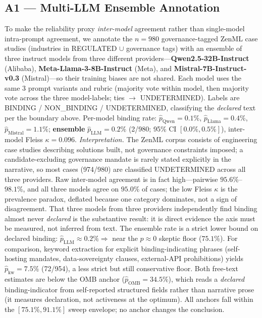 \documentclass{article} %
\begin{document}
\subsection*{A1 — Multi-LLM Ensemble Annotation}
To make the reliability proxy \emph{inter-model} agreement rather than single-model intra-prompt agreement, we annotate the $n{=}980$ governance-tagged ZenML case studies (industries in REGULATED $\cup$ governance tags) with an ensemble of three instruct models from three different providers---\textbf{Qwen2.5-32B-Instruct} (Alibaba), \textbf{Meta-Llama-3-8B-Instruct} (Meta), and \textbf{Mistral-7B-Instruct-v0.3} (Mistral)---so their training biases are not shared. Each model uses the same 3 prompt variants and rubric (majority vote within model, then majority vote across the three model-labels; ties $\to$ UNDETERMINED). Labels are BINDING / NON\_BINDING / UNDETERMINED, classifying the \emph{declared} text per the boundary above.
Per-model binding rate: $\hat{p}_{\text{Qwen}} = 0.1\%$, $\hat{p}_{\text{Llama}} = 0.4\%$, $\hat{p}_{\text{Mistral}} = 1.1\%$; \textbf{ensemble} $\hat{p}_{\text{LLM}} = 0.2\%$ (2/980; 95\% CI $[0.0\%, 0.5\%]$), inter-model Fleiss $\kappa = 0.096$.
\emph{Interpretation.} The ZenML corpus consists of engineering case studies describing solutions built, not governance constraints imposed; a candidate-excluding governance mandate is rarely stated explicitly in the narrative, so most cases (974/980) are classified UNDETERMINED across all three providers. Raw inter-model agreement is in fact high---pairwise $95.6\%$--$98.1\%$, and all three models agree on $95.0\%$ of cases; the low Fleiss $\kappa$ is the prevalence paradox, deflated because one category dominates, not a sign of disagreement. That three models from three providers independently find binding almost never \emph{declared} is the substantive result: it is direct evidence the axis must be measured, not inferred from text. The ensemble rate is a strict lower bound on declared binding: $\hat{p}_{\text{LLM}} \approx 0.2\% \Rightarrow$ near the $p{\approx}0$ skeptic floor ($75.1\%$).
For comparison, keyword extraction for explicit binding-indicating phrases (self-hosting mandates, data-sovereignty clauses, external-API prohibitions) yields $\hat{p}_{\text{kw}} = 7.5\%$ (72/954), a less strict but still conservative floor.
Both free-text estimates are below the OMB anchor ($\hat{p}_{\text{OMB}} = 34.5\%$), which reads a \emph{declared} binding-indicator from self-reported structured fields rather than narrative prose (it measures declaration, not activeness at the optimum).
All anchors fall within the $[75.1\%, 91.1\%]$ sweep envelope; no anchor changes the conclusion.
\end{document}
